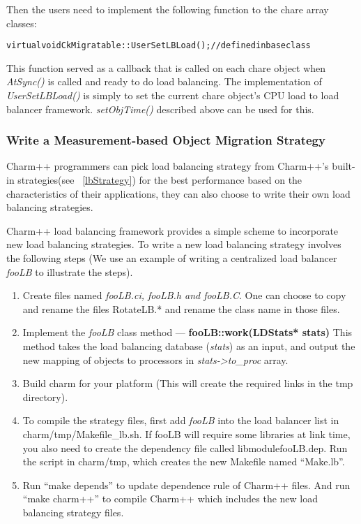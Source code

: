 Then the users need to implement the following function to the chare array
classes:

\begin{alltt}
   virtual void CkMigratable::UserSetLBLoad();      // defined in base class
\end{alltt}

This function served as a callback that is called on each chare object when
{\em AtSync()} is called and ready to do load balancing. The implementation of
{\em UserSetLBLoad()} is simply to set the current chare object's CPU load to
load balancer framework. {\em setObjTime()} described above can be used for
this.

\subsubsection{Write a Measurement-based Object Migration Strategy}
\label{writelb}

Charm++ programmers can pick load balancing strategy from Charm++'s built-in
strategies(see ~\ref{lbStrategy}) for the best performance based on the 
characteristics of their applications, they can also choose to write their 
own load balancing strategies.

Charm++ load balancing framework provides a simple scheme to incorporate new 
load balancing strategies. To write a new load balancing strategy
involves the following steps (We use an example of writing a centralized
load balancer {\em fooLB} to illustrate the steps).

\begin{enumerate}
\item Create files named {\em fooLB.ci, fooLB.h and fooLB.C}. One can choose to
copy and rename the files RotateLB.* and rename the class name in those files.

\item Implement the {\em fooLB} class method --- {\bf fooLB::work(LDStats*
stats)} This method takes the load balancing database ({\em stats}) as an
input, and output the new mapping of objects to processors in {\em
stats->to\_proc} array.

\item Build charm for your platform (This will create the required links in the tmp directory).

\item To compile the strategy files, first add {\em fooLB} into the load
balancer list in charm/tmp/Makefile\_lb.sh. If fooLB will require some
libraries at link time, you also need to create the dependency file called
libmodulefooLB.dep. Run the script in charm/tmp, which creates the new Makefile
named ``Make.lb''.

\item Run ``make depends'' to update dependence rule of Charm++ files.  And run
``make charm++'' to compile Charm++ which includes the new load balancing
strategy files.
\end{enumerate}


